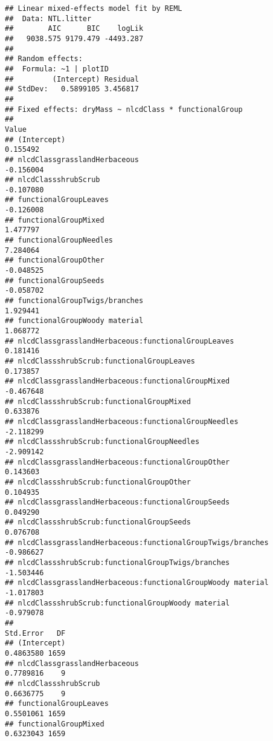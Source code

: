 \documentclass[]{article}
\begin{document}
\begin{verbatim}
## Linear mixed-effects model fit by REML
##  Data: NTL.litter 
##        AIC      BIC    logLik
##   9038.575 9179.479 -4493.287
## 
## Random effects:
##  Formula: ~1 | plotID
##         (Intercept) Residual
## StdDev:   0.5899105 3.456817
## 
## Fixed effects: dryMass ~ nlcdClass * functionalGroup 
##                                                                Value
## (Intercept)                                                 0.155492
## nlcdClassgrasslandHerbaceous                               -0.156004
## nlcdClassshrubScrub                                        -0.107080
## functionalGroupLeaves                                      -0.126008
## functionalGroupMixed                                        1.477797
## functionalGroupNeedles                                      7.284064
## functionalGroupOther                                       -0.048525
## functionalGroupSeeds                                       -0.058702
## functionalGroupTwigs/branches                               1.929441
## functionalGroupWoody material                               1.068772
## nlcdClassgrasslandHerbaceous:functionalGroupLeaves          0.181416
## nlcdClassshrubScrub:functionalGroupLeaves                   0.173857
## nlcdClassgrasslandHerbaceous:functionalGroupMixed          -0.467648
## nlcdClassshrubScrub:functionalGroupMixed                    0.633876
## nlcdClassgrasslandHerbaceous:functionalGroupNeedles        -2.118299
## nlcdClassshrubScrub:functionalGroupNeedles                 -2.909142
## nlcdClassgrasslandHerbaceous:functionalGroupOther           0.143603
## nlcdClassshrubScrub:functionalGroupOther                    0.104935
## nlcdClassgrasslandHerbaceous:functionalGroupSeeds           0.049290
## nlcdClassshrubScrub:functionalGroupSeeds                    0.076708
## nlcdClassgrasslandHerbaceous:functionalGroupTwigs/branches -0.986627
## nlcdClassshrubScrub:functionalGroupTwigs/branches          -1.503446
## nlcdClassgrasslandHerbaceous:functionalGroupWoody material -1.017803
## nlcdClassshrubScrub:functionalGroupWoody material          -0.979078
##                                                            Std.Error   DF
## (Intercept)                                                0.4863580 1659
## nlcdClassgrasslandHerbaceous                               0.7789816    9
## nlcdClassshrubScrub                                        0.6636775    9
## functionalGroupLeaves                                      0.5501061 1659
## functionalGroupMixed                                       0.6323043 1659

\end{verbatim}
\end{document}
